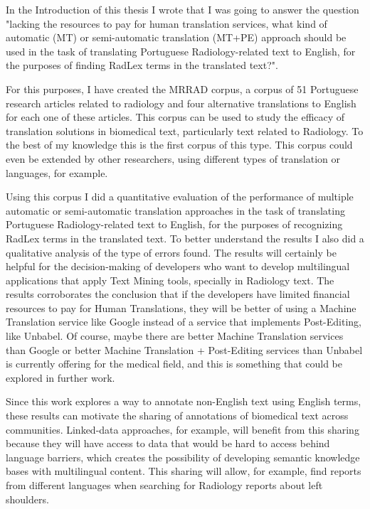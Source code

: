 \label{chap5}

In the Introduction of this thesis I wrote that I was going to answer the question "lacking the resources to pay for human translation services, what kind of automatic (MT) or semi-automatic translation (MT+PE) approach should be used in the task of translating Portuguese Radiology-related text to English, for the purposes of finding RadLex terms in the translated text?". 

For this purposes, I have created the MRRAD corpus, a corpus of 51 Portuguese research articles related to radiology and four alternative translations to English for each one of these articles. This corpus can be used to study the efficacy of translation solutions in biomedical text, particularly text related to Radiology. To the best of my knowledge this is the first corpus of this type. This corpus could even be extended by other researchers, using different types of translation or languages, for example. 

Using this corpus I did a quantitative evaluation of the performance of multiple automatic or semi-automatic translation approaches in the task of translating Portuguese Radiology-related text to English, for the purposes of recognizing RadLex terms in the translated text. To better understand the results I also did a qualitative analysis of the type of errors found. The results will certainly be helpful for the decision-making of developers who want to develop multilingual applications that apply Text Mining tools, specially in Radiology text. The results corroborates the conclusion that if the developers have limited financial resources to pay for Human Translations, they will be better of using a Machine Translation service like Google instead of a service that implements Post-Editing, like Unbabel. Of course, maybe there are better Machine Translation services than Google or better Machine Translation + Post-Editing services than Unbabel is currently offering for the medical field, and this is something that could be explored in further work. 

Since this work explores a way to annotate non-English text using English terms, these results can motivate the sharing of annotations of biomedical text across communities. Linked-data \citep{Barros2016} approaches, for example, will benefit from this sharing because they will have access to data that would be hard to access behind language barriers, which creates the possibility of developing semantic knowledge bases \citep{Monteiro2016} with multilingual content. This sharing will allow, for example, find reports from different languages when searching for Radiology reports about left shoulders.

